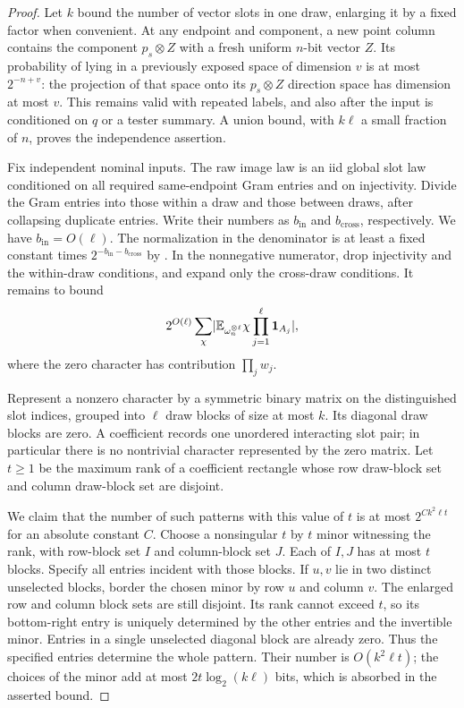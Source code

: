 \begin{proof}
Let $k$ bound the number of vector slots in one draw, enlarging it by a
fixed factor when convenient. At any endpoint and component, a new
point column contains the component $p_s\otimes Z$ with a fresh uniform
$n$-bit vector $Z$. Its probability of lying in a previously exposed
space of dimension $v$ is at most $2^{-n+v}$: the projection of that
space onto its $p_s\otimes Z$ direction space has dimension at most
$v$. This remains valid with repeated labels, and also after the input
is conditioned on $q$ or a tester summary. A union bound, with
$k\ell$ a small fraction of $n$, proves the independence assertion.

Fix independent nominal inputs. The raw image law is an iid global
slot law conditioned on all required same-endpoint Gram entries and
on injectivity. Divide the Gram entries into those within a draw and
those between draws, after collapsing duplicate entries. Write their
numbers as $b_{\mathrm{in}}$ and $b_{\mathrm{cross}}$, respectively.
We have $b_{\mathrm{in}}=O(\ell)$. The normalization in the denominator
is at least a fixed constant times
$2^{-b_{\mathrm{in}}-b_{\mathrm{cross}}}$ by
. In the nonnegative numerator,
drop injectivity and the within-draw conditions, and expand only the
cross-draw conditions. It remains to bound
\[
 2^{O(\ell)}\sum_{\chi}
 \lvert \mathbb E_{\omega_n^{\otimes\ell}}
          \chi\prod_{j=1}^{\ell}\mathbf 1_{A_j}\rvert,
\]
where the zero character has contribution $\prod_jw_j$.

Represent a nonzero character by a symmetric binary matrix on the
distinguished slot indices, grouped into $\ell$ draw blocks of size
at most $k$. Its diagonal draw blocks are zero. A coefficient records
one unordered interacting slot pair; in particular there is no
nontrivial character represented by the zero matrix. Let $t\ge1$ be
the maximum rank of a coefficient rectangle whose row draw-block set
and column draw-block set are disjoint.

We claim that the number of such patterns with this value of $t$ is at
most $2^{Ck^2\ell t}$ for an absolute constant $C$. Choose a nonsingular
$t$ by $t$ minor witnessing the rank, with row-block set $I$ and
column-block set $J$. Each of $I,J$ has at most $t$ blocks. Specify all
entries incident with those blocks. If $u,v$ lie in two distinct
unselected blocks, border the chosen minor by row $u$ and column $v$.
The enlarged row and column block sets are still disjoint. Its rank
cannot exceed $t$, so its bottom-right entry is uniquely determined by
the other entries and the invertible minor. Entries in a single
unselected diagonal block are already zero. Thus the specified entries
determine the whole pattern. Their number is $O(k^2\ell t)$; the choices
of the minor add at most $2t\log_2(k\ell)$ bits, which is absorbed in
the asserted bound.


\end{proof}
